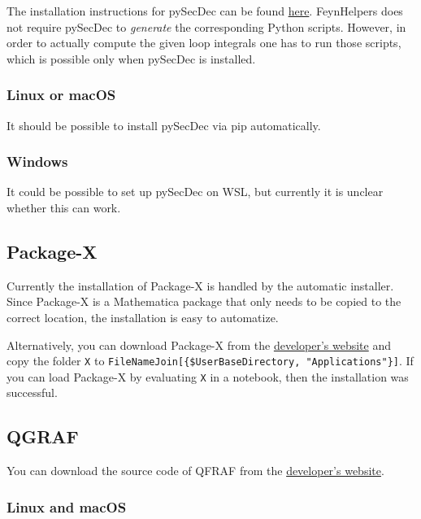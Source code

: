 \documentclass[../FeynHelpersManual.tex]{subfiles}
\begin{document}
The installation instructions for pySecDec can be found
\href{https://secdec.readthedocs.io/en/stable/installation.html\#download-the-program-and-install}{here}.
FeynHelpers does not require pySecDec to \emph{generate} the
corresponding Python scripts. However, in order to actually compute the
given loop integrals one has to run those scripts, which is possible
only when pySecDec is installed.

\hypertarget{linux-or-macos-1}{%
\subsubsection{Linux or macOS}\label{linux-or-macos-1}}

It should be possible to install pySecDec via pip automatically.

\hypertarget{windows-3}{%
\subsubsection{Windows}\label{windows-3}}

It could be possible to set up pySecDec on WSL, but currently it is
unclear whether this can work.

\hypertarget{package-x}{%
\subsection{Package-X}\label{package-x}}

Currently the installation of Package-X is handled by the automatic
installer. Since Package-X is a Mathematica package that only needs to
be copied to the correct location, the installation is easy to
automatize.

Alternatively, you can download Package-X from the
\href{https://packagex.hepforge.org/}{developer's website} and copy the
folder \texttt{X} to
\texttt{FileNameJoin[\allowbreak{}\{\allowbreak{}\$UserBaseDirectory,\ \allowbreak{}"Applications"\}]}.
If you can load Package-X by evaluating \texttt{X\textasciigrave } in a
notebook, then the installation was successful.

\hypertarget{qgraf}{%
\subsection{QGRAF}\label{qgraf}}

You can download the source code of QFRAF from the
\href{http://cfif.ist.utl.pt/~paulo/qgraf.html}{developer's website}.

\hypertarget{linux-and-macos}{%
\subsubsection{Linux and macOS}\label{linux-and-macos}}
\end{document}
